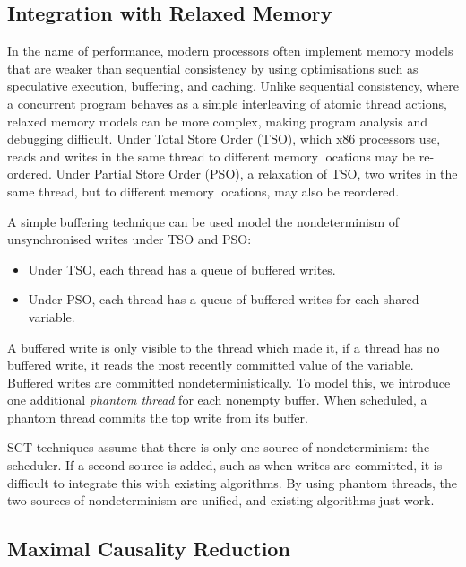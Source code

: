 \subsection{Integration with Relaxed Memory}

In the name of performance, modern processors often implement memory models that
are weaker than sequential consistency\cite{lamport1979} by using optimisations
such as speculative execution, buffering, and caching.  Unlike sequential
consistency, where a concurrent program behaves as a simple interleaving of
atomic thread actions, relaxed memory models can be more complex, making program
analysis and debugging difficult.  Under Total Store Order (TSO), which x86
processors use\cite{owens2009}, reads and writes in the same thread to different
memory locations may be re-ordered.  Under Partial Store Order (PSO), a
relaxation of TSO\cite{sparc}, two writes in the same thread, but to different
memory locations, may also be reordered.

A simple buffering technique can be used model the nondeterminism of
unsynchronised writes under TSO and PSO\cite{zhang2015}:

\begin{itemize}
\item Under TSO, each thread has a queue of buffered writes.
\item Under PSO, each thread has a queue of buffered writes for each shared
variable.
\end{itemize}

A buffered write is only visible to the thread which made it, if a thread has no
buffered write, it reads the most recently committed value of the variable.
Buffered writes are committed nondeterministically.  To model this, we introduce
one additional \emph{phantom thread} for each nonempty buffer.  When scheduled,
a phantom thread commits the top write from its buffer.

SCT techniques assume that there is only one source of nondeterminism: the
scheduler.  If a second source is added, such as when writes are committed, it
is difficult to integrate this with existing algorithms.  By using phantom
threads, the two sources of nondeterminism are unified, and existing algorithms
just work\cite{zhang2015}.

\subsection{Maximal Causality Reduction}

